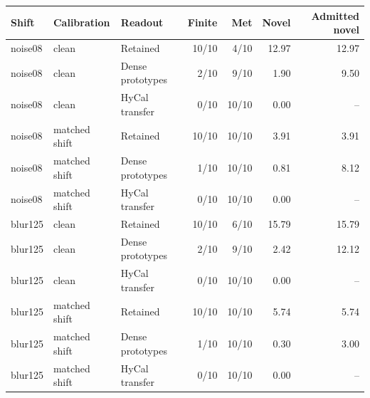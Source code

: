 \begin{tabular}{@{}lllrrrr@{}}
\toprule
Shift & Calibration & Readout & Finite & Met & Novel & Admitted novel \\
\midrule
noise08 & clean & Retained & 10/10 & 4/10 & 12.97 & 12.97 \\
noise08 & clean & Dense prototypes & 2/10 & 9/10 & 1.90 & 9.50 \\
noise08 & clean & HyCal transfer & 0/10 & 10/10 & 0.00 & -- \\
noise08 & matched shift & Retained & 10/10 & 10/10 & 3.91 & 3.91 \\
noise08 & matched shift & Dense prototypes & 1/10 & 10/10 & 0.81 & 8.12 \\
noise08 & matched shift & HyCal transfer & 0/10 & 10/10 & 0.00 & -- \\
blur125 & clean & Retained & 10/10 & 6/10 & 15.79 & 15.79 \\
blur125 & clean & Dense prototypes & 2/10 & 9/10 & 2.42 & 12.12 \\
blur125 & clean & HyCal transfer & 0/10 & 10/10 & 0.00 & -- \\
blur125 & matched shift & Retained & 10/10 & 10/10 & 5.74 & 5.74 \\
blur125 & matched shift & Dense prototypes & 1/10 & 10/10 & 0.30 & 3.00 \\
blur125 & matched shift & HyCal transfer & 0/10 & 10/10 & 0.00 & -- \\
\bottomrule
\end{tabular}
